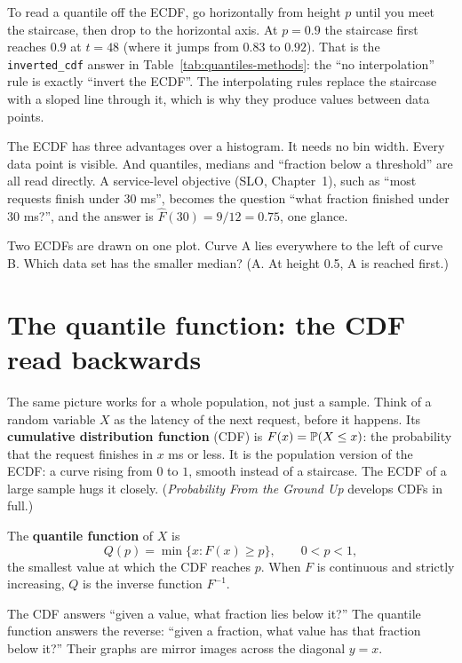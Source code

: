 To read a quantile off the ECDF, go horizontally from height $p$ until you meet the
staircase, then drop to the horizontal axis. At $p = 0.9$ the staircase first reaches
$0.9$ at $t = 48$ (where it jumps from $0.83$ to $0.92$). That is the
\texttt{inverted\_cdf} answer in Table~\ref{tab:quantiles-methods}: the ``no
interpolation'' rule is exactly ``invert the ECDF''. The interpolating rules replace the
staircase with a sloped line through it, which is why they produce values between data
points.

The ECDF has three advantages over a histogram. It needs no bin width. Every data
point is visible. And quantiles, medians and ``fraction below a threshold'' are all
read directly. A service-level objective (SLO, Chapter~1), such as ``most requests
finish under 30 ms'', becomes the question ``what fraction finished under 30 ms?'', and
the answer is $\hat F(30) = 9/12 = 0.75$, one glance.

\begin{recoverybox}
Two ECDFs are drawn on one plot. Curve A lies everywhere to the left of curve B. Which
data set has the smaller median? (A. At height 0.5, A is reached first.)
\end{recoverybox}

\section{The quantile function: the CDF read backwards}

The same picture works for a whole population, not just a sample. Think of a random
variable $X$ as the latency of the next request, before it happens. Its
\textbf{cumulative distribution function} (CDF) is $F(x) = \P(X \le x)$: the
probability that the request finishes in $x$ ms or less. It is the population version of
the ECDF: a curve rising from $0$ to $1$, smooth instead of a staircase. The ECDF of a
large sample hugs it closely. (\emph{Probability From the Ground Up} develops CDFs in
full.)

\begin{definition}
The \textbf{quantile function} of $X$ is
\[
  Q(p) = \min\{x : F(x) \ge p\}, \qquad 0 < p < 1 ,
\]
the smallest value at which the CDF reaches $p$. When $F$ is continuous and strictly
increasing, $Q$ is the inverse function $F^{-1}$.
\end{definition}

The CDF answers ``given a value, what fraction lies below it?'' The quantile function
answers the reverse: ``given a fraction, what value has that fraction below it?'' Their
graphs are mirror images across the diagonal $y = x$.

